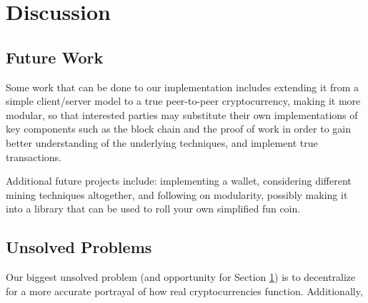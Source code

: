 \documentclass[12pt]{article}
\begin{document}
\section{Discussion}\label{future}
\subsection{Future Work}\label{work}
Some work that can be done to our implementation includes extending it from a simple client/server model to a true peer-to-peer cryptocurrency, making it more modular, so that interested parties may substitute their own implementations of key components such as the block chain and the proof of work in order to gain better understanding of the underlying techniques, and implement true transactions. 

Additional future projects include: implementing a wallet, considering different mining techniques altogether, and following on modularity, possibly making it into a library that can be used to roll your own simplified fun coin.

\subsection{Unsolved Problems}\label{unsolved}
Our biggest unsolved problem (and opportunity for Section \ref{future}) is to decentralize for a more accurate portrayal of how real cryptocurrencies function. Additionally, 



\end{document}
